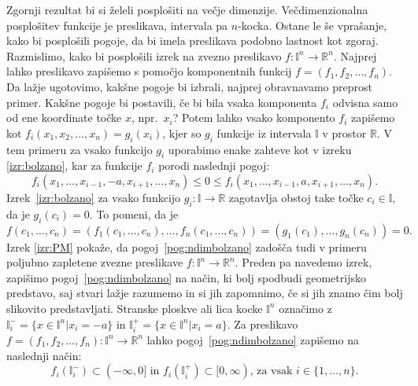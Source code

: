 \documentclass[mat1]{fmfdelo}
\newcommand{\R}{\mathbb R}
\newcommand{\I}{\mathbb I}
\newcommand{\0}{0}
\begin{document}
Zgornji rezultat bi si želeli posplošiti na večje dimenzije. Večdimenzionalna posplošitev funkcije je preslikava, intervala pa $n$-kocka. Ostane le še vprašanje, kako bi posplošili pogoje, da bi imela preslikava podobno lastnost kot zgoraj. Razmislimo, kako bi posplošili izrek na zvezno preslikavo $f : \I^n \to \R^n$. Najprej lahko preslikavo zapišemo s pomočjo komponentnih funkcij $f = (f_1, f_2, \dots, f_n)$. Da lažje ugotovimo, kakšne pogoje bi izbrali, najprej obravnavamo preprost primer. Kakšne pogoje bi postavili, če bi bila vsaka komponenta $f_i$ odvisna samo od ene koordinate točke $x$, npr.\ $x_i$? Potem lahko vsako komponento $f_i$ zapišemo kot $f_i(x_1, x_2, \dots, x_n) = g_i(x_i)$, kjer so $g_i$ funkcije iz intervala $\I$ v prostor $\R$. V tem primeru za vsako funkcijo $g_i$ uporabimo enake zahteve kot v izreku \ref{izr:bolzano}, kar za funkcije $f_i$ porodi naslednji pogoj: 
\begin{equation}\label{pog:ndimbolzano}
f_i(x_1, \dots, x_{i-1}, -a, x_{i+1}, \dots, x_n) \leq 0 \leq f_i(x_1, \dots, x_{i-1}, a, x_{i+1}, \dots, x_n).
\end{equation}
Izrek~\ref{izr:bolzano} za vsako funkcijo $g_i : \I \to \R$ zagotavlja obstoj take točke $c_i \in \I$, da je $g_i(c_i) = 0$. To pomeni, da je
$$f(c_1, \dots, c_n) = (f_1(c_1, \dots, c_n), \dots, f_n(c_1, \dots, c_n)) = (g_1(c_1), \dots, g_n(c_n)) = \0.$$
Izrek \ref{izr:PM} pokaže, da pogoj~\eqref{pog:ndimbolzano} zadošča tudi v primeru poljubno zapletene zvezne preslikave $f : \I^n \to \R^n$. Preden pa navedemo izrek, zapišimo pogoj~\eqref{pog:ndimbolzano} na način, ki bolj spodbudi geometrijsko predstavo, saj stvari lažje razumemo in si jih zapomnimo, če si jih znamo čim bolj slikovito predstavljati.
Stranske ploskve ali lica kocke $\I^n$ označimo z $\I_i^- = \{x\in \I^n | x_i = -a\}$ in $\I_i^+ = \{x\in \I^n | x_i = a\}.$ Za preslikavo $f = (f_1, f_2, \dots, f_n) : \I^n \to \R^n$ lahko pogoj~\eqref{pog:ndimbolzano} zapišemo na naslednji način:
\begin{equation}\label{pog:PM}
f_i(\I_i^-) \subset (- \infty, 0]  \text{ in } f_i(\I_i^+) \subset [0, \infty) \text{, za vsak } i \in  \{1, \dots, n\}.
\end{equation}

\end{document}
